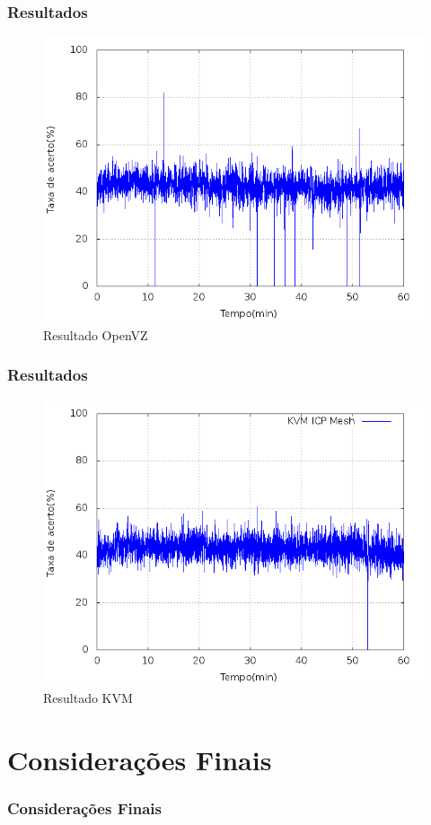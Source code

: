 \documentclass{beamer}
\begin{document}
    \begin{frame}
     \frametitle{Resultados}
      \begin{figure}
      \centering
      \includegraphics[scale=0.4]{imagens/grafico_openvz.png}
      \caption{Resultado OpenVZ}
      \end{figure}
    \end{frame}

    \begin{frame}
     \frametitle{Resultados}
      \begin{figure}
      \centering
      \includegraphics[scale=0.4]{imagens/kvm.png}
      \caption{Resultado KVM}
      \end{figure}
    \end{frame}

    \section{Considerações Finais}
    \begin{frame}
     \frametitle{Considerações Finais}
    \end{frame}
\end{document}
